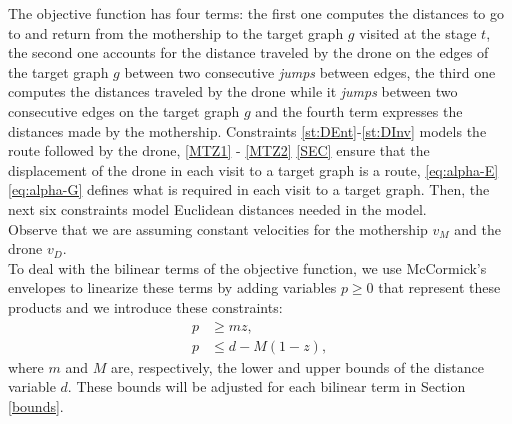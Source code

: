 \noindent
The objective function has four terms: the first one computes the distances to go to and return from the mothership to the target graph $g$ visited at the stage $t$, the second one accounts for the distance traveled by the drone on the edges of the target graph $g$ between two consecutive \textit{jumps} between edges, the third one computes the distances traveled by the drone while it \textit{jumps} between two consecutive edges on the target graph $g$ and the fourth term expresses the distances made by the mothership. Constraints \eqref{st:DEnt}-\eqref{st:DInv} models the route followed by the drone, \eqref{MTZ1} - \eqref{MTZ2}  \eqref{SEC} ensure that the displacement of the drone in each visit to a target graph is a route, \eqref{eq:alpha-E}  \eqref{eq:alpha-G} defines what is required in each visit to a target graph. Then, the next six constraints model Euclidean distances needed in the model. \\
\noindent
Observe that we are assuming constant velocities for the mothership $v_M$ and the drone $v_D$.\\
\noindent
To deal with the bilinear terms of the objective function, we use McCormick's envelopes to linearize these terms by adding variables $p\geq 0$ that represent these products and we introduce these constraints:
\begin{align*}
    p & \geq  m z, \\
    p & \leq d - M(1 - z),
\end{align*}
where $m$ and $M$ are, respectively, the lower and upper bounds of the distance variable $d$. These bounds will be adjusted for each bilinear term in Section \ref{bounds}.


